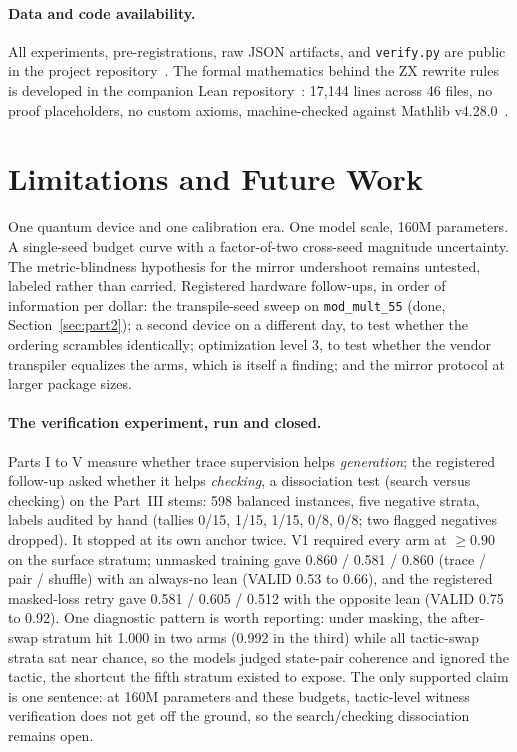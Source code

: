 \paragraph{Data and code availability.} All experiments, pre-registrations, raw JSON artifacts, and \texttt{verify.py} are public in the project repository~\cite{appliedrepo2026}. The formal mathematics behind the ZX rewrite rules is developed in the companion Lean repository~\cite{liquidtqft2026}: 17{,}144 lines across 46 files, no proof placeholders, no custom axioms, machine-checked against Mathlib v4.28.0~\cite{mathlib2020,demoura2021lean}.

\section{Limitations and Future Work}\label{sec:limitations}

One quantum device and one calibration era. One model scale, 160M parameters. A single-seed budget curve with a factor-of-two cross-seed magnitude uncertainty. The metric-blindness hypothesis for the mirror undershoot remains untested, labeled rather than carried. Registered hardware follow-ups, in order of information per dollar: the transpile-seed sweep on \texttt{mod\_mult\_55} (done, Section~\ref{sec:part2}); a second device on a different day, to test whether the ordering scrambles identically; optimization level 3, to test whether the vendor transpiler equalizes the arms, which is itself a finding; and the mirror protocol at larger package sizes.

\paragraph{The verification experiment, run and closed.} Parts I to V measure whether trace supervision helps \emph{generation}; the registered follow-up asked whether it helps \emph{checking}, a dissociation test (search versus checking) on the Part~III stems: 598 balanced instances, five negative strata, labels audited by hand (tallies 0/15, 1/15, 1/15, 0/8, 0/8; two flagged negatives dropped). It stopped at its own anchor twice. V1 required every arm at $\geq 0.90$ on the surface stratum; unmasked training gave 0.860 / 0.581 / 0.860 (trace / pair / shuffle) with an always-no lean (VALID 0.53 to 0.66), and the registered masked-loss retry gave 0.581 / 0.605 / 0.512 with the opposite lean (VALID 0.75 to 0.92). One diagnostic pattern is worth reporting: under masking, the after-swap stratum hit 1.000 in two arms (0.992 in the third) while all tactic-swap strata sat near chance, so the models judged state-pair coherence and ignored the tactic, the shortcut the fifth stratum existed to expose. The only supported claim is one sentence: at 160M parameters and these budgets, tactic-level witness verification does not get off the ground, so the search/checking dissociation remains open.

